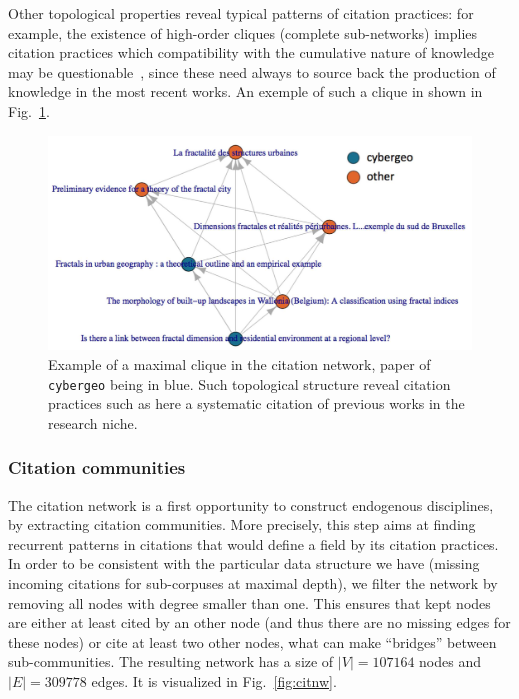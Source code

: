 Other topological properties reveal typical patterns of citation practices: for example, the existence of high-order cliques (complete sub-networks) implies citation practices which compatibility with the cumulative nature of knowledge may be questionable~\cite{pumain2005cumulativite}, since these need always to source back the production of knowledge in the most recent works. An exemple of such a clique in shown in Fig.~\ref{fig:cliques}.



\begin{figure}
\includegraphics[width=\textwidth]{figures/Fig4.jpg}
\caption{Example of a maximal clique in the citation network, paper of \texttt{cybergeo} being in blue. Such topological structure reveal citation practices such as here a systematic citation of previous works in the research niche.}
\label{fig:cliques}
\end{figure}



\subsubsection*{Citation communities}

The citation network is a first opportunity to construct endogenous disciplines, by extracting citation communities. More precisely, this step aims at finding recurrent patterns in citations that would define a field by its citation practices. In order to be consistent with the particular data structure we have (missing incoming citations for sub-corpuses at maximal depth), we filter the network by removing all nodes with degree smaller than one. This ensures that kept nodes are either at least cited by an other node (and thus there are no missing edges for these nodes) or cite at least two other nodes, what can make ``bridges'' between sub-communities. The resulting network has a size of $\left|V\right| = 107164$ nodes and $\left|E\right| = 309778$ edges. It is visualized in Fig.~\ref{fig:citnw}.



